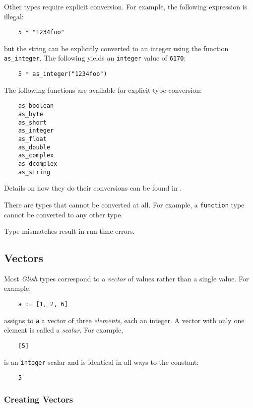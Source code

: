 Other types require explicit conversion.
For example, the following expression is illegal:
\begin{verbatim}
    5 * "1234foo"
\end{verbatim}
but the string can be explicitly
converted to an integer using the function {\tt as\_integer}.  The
following yields an {\tt integer} value of {\tt 6170}:
\begin{verbatim}
    5 * as_integer("1234foo")
\end{verbatim}
The following functions are available for explicit type conversion:
\begin{verbatim}
    as_boolean
    as_byte
    as_short
    as_integer
    as_float
    as_double
    as_complex
    as_dcomplex
    as_string
\end{verbatim}
Details on how they do their conversions can be found in
.

There are types that cannot be converted at all.
For example, a {\tt function} type cannot be converted to any other type.

Type mismatches result in run-time errors.

\subsection{Vectors}
\label{vectors}

Most {\em Glish} types correspond to a {\em vector}
of values rather than a single value.  For example,
\begin{verbatim}
    a := [1, 2, 6]
\end{verbatim}
assigns to {\tt a} a vector of three {\em elements}, each an integer.
A vector with only one element is called a {\em scalar\/}.
For example,
\begin{verbatim}
    [5]
\end{verbatim}
is an {\tt integer} scalar and is identical in all ways to the constant:
\begin{verbatim}
    5
\end{verbatim}

\subsubsection{Creating Vectors}
\label{creating-vectors}

